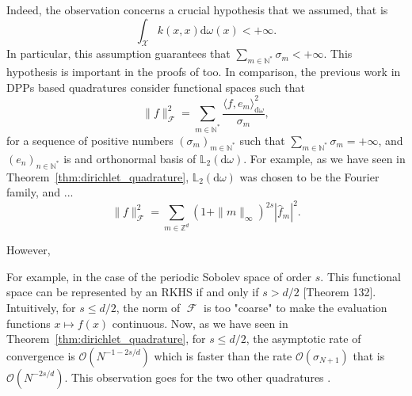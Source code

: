\documentclass[twoside,11pt]{book}
\numberwithin{theorem}{chapter}
\numberwithin{definition}{chapter}
\numberwithin{proposition}{chapter}
\numberwithin{corollary}{chapter}
\numberwithin{example}{chapter}
\numberwithin{lemma}{chapter}
\numberwithin{assumption}{chapter}
\numberwithin{equation}{chapter}
\numberwithin{figure}{chapter}
\DeclareMathOperator{\F}{\mathcal{F}}
\DeclareMathOperator{\X}{\mathcal{X}}
\begin{document}
Indeed, the observation concerns a crucial hypothesis that we assumed, that is
\begin{equation}
\int_{\X}k(x,x) \mathrm{d}\omega(x)<+\infty.
\end{equation} 
In particular, this assumption guarantees that $\sum_{m \in \mathbb{N}^{*}} \sigma_m <+\infty$. This hypothesis is important in the proofs of \citep{Bac17} too. 
In comparison, the previous work in DPPs based quadratures consider functional spaces such that  
\begin{equation}
\|f\|_{\F}^{2} = \sum\limits_{m \in \mathbb{N}^{*}} \frac{\langle f,e_{m} \rangle_{\mathrm{d}\omega}^{2}}{\sigma_m},
\end{equation}
for a sequence of positive numbers $(\sigma_{m})_{m \in \mathbb{N}^{*}}$ such that $\sum_{m \in \mathbb{N}^{*}} \sigma_m =+\infty$, and $(e_{n})_{n \in \mathbb{N}^{*}}$ is and orthonormal basis of $\mathbb{L}_{2}(\mathrm{d}\omega)$. For example, as we have seen in Theorem~\ref{thm:dirichlet_quadrature}, $\mathbb{L}_{2}(\mathrm{d}\omega)$ was chosen to be the Fourier family, and ...
\begin{equation}
\|f\|^{2}_{\F} = \sum\limits_{m \in \mathbb{Z}^{d}} (1+ \|m\|_{\infty})^{2s} |\hat{f}_{m}|^{2}.
\end{equation}

However, 



For example, in the case of the periodic Sobolev space of order $s$. This functional space can be represented by an RKHS if and only if $s>d/2$ \citep{BeTh11}[Theorem 132]. Intuitively, for $s \leq d/2$, the norm of $\F$ is too "coarse" to make the evaluation functions $x \mapsto f(x)$ continuous. Now, as we have seen in Theorem~\ref{thm:dirichlet_quadrature}, for $s\leq d/2$, the asymptotic rate of convergence is $\mathcal{O}(N^{-1-2s/d})$ which is faster than the rate $\mathcal{O}(\sigma_{N+1})$ that is $\mathcal{O}(N^{-2s/d})$. This observation goes for the two other quadratures  \citep{BaHa16,Joh97}.

\end{document}
